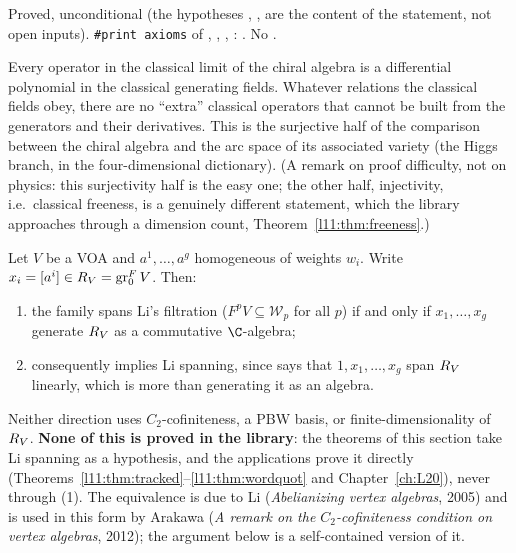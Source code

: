 \begin{status}
Proved, unconditional (the hypotheses , ,  are the content of the statement, not open
inputs). \texttt{\#print axioms} of \allowbreak{}\allowbreak{}\allowbreak{},
\allowbreak{}\allowbreak{}\allowbreak{}\allowbreak{}\allowbreak{}\allowbreak{},
\allowbreak{}\allowbreak{}\allowbreak{}\allowbreak{},
\allowbreak{}\allowbreak{}\allowbreak{}\allowbreak{}:
\lean{[propext, Classical.}\allowbreak{}\allowbreak\lean{sound]}. No .
\end{status}

\begin{physics}
Every operator in the classical limit of the chiral algebra is a differential polynomial in the classical generating
fields. Whatever relations the classical fields obey, there are no ``extra'' classical operators that cannot be built from
the generators and their derivatives. This is the surjective half of the comparison between the chiral algebra and the
arc space of its associated variety (the Higgs branch, in the four-dimensional dictionary). (A remark on proof difficulty, not on
physics: this surjectivity half is the easy one; the other half, injectivity, i.e.\ classical freeness, is a genuinely
different statement, which the library approaches through a dimension count, Theorem~\ref{l11:thm:freeness}.)
\end{physics}

\begin{remark}\label{l11:rem:hdechspan}
Let $V$ be a VOA and $a^1,\dots,a^g$ homogeneous of weights $w_i$. Write $x_i = [a^i]\in R_V = \operatorname{gr}^F_0V$.
Then:
\begin{enumerate}
\item the family spans Li's filtration ($F^pV\subseteq\mathcal W_p$ for all $p$) if and only if $x_1,\dots,x_g$ generate
  $R_V$ as a commutative $\C$-algebra;
\item consequently  implies Li spanning, since  says that $1,x_1,\dots,x_g$ span $R_V$
  linearly, which is more than generating it as an algebra.
\end{enumerate}
Neither direction uses $C_2$-cofiniteness, a PBW basis, or finite-dimensionality of $R_V$. \textbf{None of this is
proved in the library}: the theorems of this section take Li spanning as a hypothesis, and the applications prove it
directly (Theorems~\ref{l11:thm:tracked}--\ref{l11:thm:wordquot} and Chapter~\ref{ch:L20}), never through (1). The
equivalence is due to Li (\emph{Abelianizing vertex algebras}, 2005) and is used in this form by Arakawa (\emph{A remark
on the $C_2$-cofiniteness condition on vertex algebras}, 2012); the argument below is a self-contained version of it.
\end{remark}

